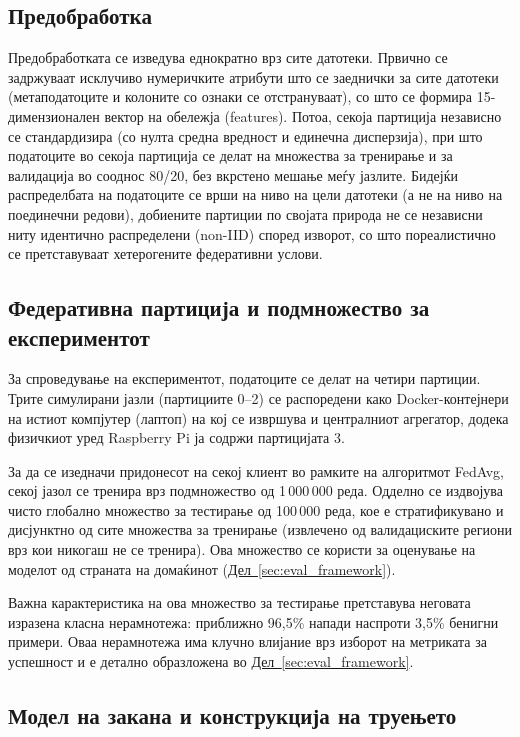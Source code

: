 \subsection{Предобработка}
Предобработката се изведува еднократно врз сите датотеки. Првично се задржуваат исклучиво нумеричките атрибути што се заеднички за сите датотеки (метаподатоците и колоните со ознаки се отстрануваат), со што се формира 15-димензионален вектор на обележја (features). Потоа, секоја партиција независно се стандардизира (со нулта средна вредност и единечна дисперзија), при што податоците во секоја партиција се делат на множества за тренирање и за валидација во сооднос 80/20, без вкрстено мешање меѓу јазлите. Бидејќи распределбата на податоците се врши на ниво на цели датотеки (а не на ниво на поединечни редови), добиените партиции по својата природа не се независни ниту идентично распределени (non-IID) според изворот, со што пореалистично се претставуваат хетерогените федеративни услови.

\subsection{Федеративна партиција и подмножество за експериментот}
За спроведување на експериментот, податоците се делат на четири партиции. Трите симулирани јазли (партициите 0--2) се распоредени како Docker-контејнери на истиот компјутер (лаптоп) на кој се извршува и централниот агрегатор, додека физичкиот уред Raspberry Pi ја содржи партицијата 3.

За да се изедначи придонесот на секој клиент во рамките на алгоритмот FedAvg, секој јазол се тренира врз подмножество од 1\,000\,000 реда. Одделно се издвојува чисто глобално множество за тестирање од 100\,000 реда, кое е стратификувано и дисјунктно од сите множества за тренирање (извлечено од валидациските региони врз кои никогаш не се тренира). Ова множество се користи за оценување на моделот од страната на домаќинот
(\hyperref[sec:eval_framework]{Дел~\ref*{sec:eval_framework}}).

Важна карактеристика на ова множество за тестирање претставува неговата изразена класна нерамнотежа: приближно 96,5\% напади наспроти 3,5\% бенигни примери. Оваа нерамнотежа има клучно влијание врз изборот на метриката за успешност и е детално образложена во \hyperref[sec:eval_framework]{Дел~\ref*{sec:eval_framework}}.

\subsection{Модел на закана и конструкција на труењето}
\label{subsec:poison}

